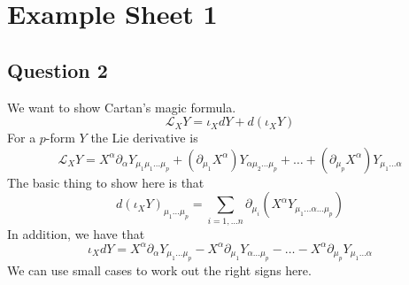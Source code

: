 \documentclass[11pt, oneside]{article}   	%
\theoremstyle{slanted}
\begin{document}



\section*{Example Sheet 1}

\subsection*{Question 2}
We want to show 
Cartan's magic formula. 
\[
	\mathcal{ L } _{ X} Y   = \iota_{ X } d Y + d \left(\iota _ X Y   \right) 
\] For a $ p$-form $ Y $ the Lie derivative 
is 
\[
 \mathcal{ L } _{ X} Y = X ^ \alpha \partial  _ \alpha Y_{ 
 \mu_1 \mu_1 \dots \mu_{ p } } + \left( \partial_{ \mu_1  } X^ \alpha \right) Y_{ 
 \alpha \mu_2 \dots \mu_ p } + \dots + \left( \partial_{ \mu_{ p } } X ^ \alpha  \right)  
 Y _{ \mu_1 \dots \alpha }
\]  
The basic thing to show here is 
that 
\[
 d \left( \iota_ X Y  \right) _{ 
 \mu_1 \dots \mu_ p }  = \sum_{ i  = 1, \dots n } \partial _{ \mu _ i } 
 \left(  X ^{ \alpha } Y_{ \mu_1 \dots \alpha \dots \mu_{ p } } \right) 
\] In addition, we have that 
\[
 \iota_X  d Y  = X ^{ \alpha } \partial  _ \alpha Y_{ 
 \mu_1 \dots \mu _ p  }   - X^ \alpha \partial _{ \mu_1 } Y_{ \alpha \dots \mu_ p  }
  - \dots  - X ^ \alpha \partial  _{ \mu_ p } Y_{ \mu _ 1 \dots \alpha }
\] 
We can use small cases 
to work out the right signs here. 
\end{document}
